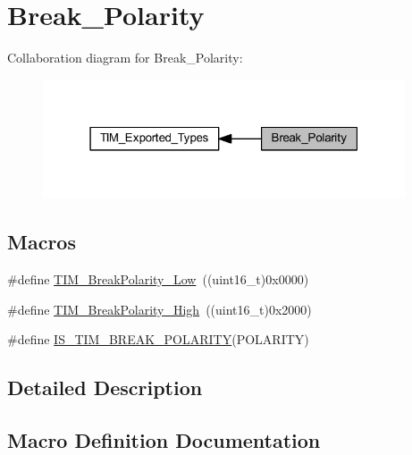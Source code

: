 \hypertarget{group___break___polarity}{}\section{Break\+\_\+\+Polarity}
\label{group___break___polarity}
Collaboration diagram for Break\+\_\+\+Polarity\+:
\nopagebreak
\begin{figure}[H]
\begin{center}
\leavevmode
\includegraphics[width=304pt]{group___break___polarity}
\end{center}
\end{figure}
\subsection*{Macros}
\begin{DoxyCompactItemize}
\item 
\#define \hyperlink{group___break___polarity_ga565656ca81d17f9a1807afe3971dff6e}{T\+I\+M\+\_\+\+Break\+Polarity\+\_\+\+Low}~((uint16\+\_\+t)0x0000)
\item 
\#define \hyperlink{group___break___polarity_gabd4b72079548fd8903413a348539542b}{T\+I\+M\+\_\+\+Break\+Polarity\+\_\+\+High}~((uint16\+\_\+t)0x2000)
\item 
\#define \hyperlink{group___break___polarity_gaa29e33e74c5ff10972357ddd3f47f078}{I\+S\+\_\+\+T\+I\+M\+\_\+\+B\+R\+E\+A\+K\+\_\+\+P\+O\+L\+A\+R\+I\+TY}(P\+O\+L\+A\+R\+I\+TY)
\end{DoxyCompactItemize}


\subsection{Detailed Description}


\subsection{Macro Definition Documentation}
\mbox{\label{group___break___polarity_gaa29e33e74c5ff10972357ddd3f47f078}} 
